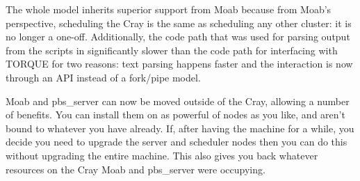The whole model inherits superior support from Moab because from Moab's
perspective, scheduling the Cray is the same as scheduling any other cluster:
it is no longer a one-off. Additionally, the code path that was used for
parsing output from the scripts in significantly slower than the code path for
interfacing with TORQUE for two reasons: text parsing happens faster and the
interaction is now through an API instead of a fork/pipe model.

Moab and pbs_server can now be moved outside of the Cray, allowing a number of
benefits. You can install them on as powerful of nodes as you like, and aren't
bound to whatever you have already.  If, after having the machine for a while,
you decide you need to upgrade the server and scheduler nodes then you can do
this without upgrading the entire machine. This also gives you back whatever
resources on the Cray Moab and pbs_server were occupying.

